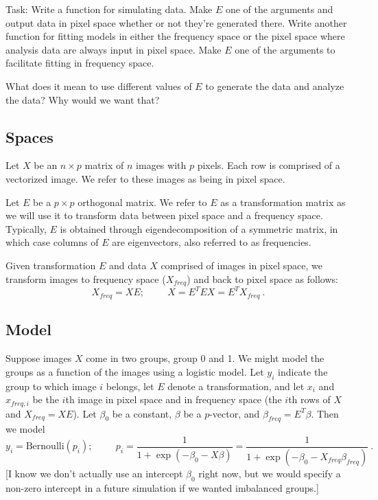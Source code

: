 \documentclass[12pt]{article}
\begin{document}
Task: Write a function for simulating data. Make $E$ one of the arguments and output data in pixel space whether or not they're generated there. Write another function for fitting models in either the frequency space or the pixel space where analysis data are always input in pixel space. Make $E$ one of the arguments to facilitate fitting in frequency space.

What does it mean to use different values of $E$ to generate the data and analyze the data? Why would we want that?



\subsection*{Spaces}

Let $X$ be an $n\times p$ matrix of $n$ images with $p$ pixels. Each row is comprised of a vectorized image. We refer to these images as being in pixel space. 

Let $E$ be a $p\times p$ orthogonal matrix. We refer to $E$ as a transformation matrix as we will use it to transform data between pixel space and a frequency space. Typically, $E$ is obtained through eigendecomposition of a symmetric matrix, in which case columns of $E$ are eigenvectors, also referred to as frequencies. 

Given transformation $E$ and data $X$ comprised of images in pixel space, we transform images to frequency space ($X_{freq}$) and back to pixel space as follows:
$$X_{freq} = XE;\hspace{1cm}
X=E^TEX=E^TX_{freq}\ .$$

\subsection*{Model}

Suppose images $X$ come in two groups, group 0 and 1. We might model the groups as a function of the images using a logistic model. Let $y_i$ indicate the group to which image $i$ belongs, let $E$ denote a transformation, and let $x_i$ and $x_{freq,i}$ be the $i$th image in pixel space and in frequency space (the $i$th rows of $X$ and $X_{freq}=XE$). Let $\beta_0$ be a constant, $\beta$ be a $p$-vector, and $\beta_{freq}=E^T\beta$. Then we model
$$y_i=\text{Bernoulli}(p_i);\hspace{1cm}
p_i=\frac{1}{1+\exp(-\beta_0-X\beta)}=\frac{1}{1+\exp(-\beta_0-X_{freq}\beta_{freq})}\ .$$ 
[I know we don't actually use an intercept $\beta_0$ right now, but we would specify a non-zero intercept in a future simulation if we wanted imbalanced groups.]
\end{document}
